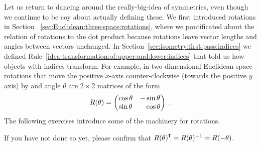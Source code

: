 Let us return to dancing around the really-big-idea of symmetries, even though we continue to be coy about actually defining these. We first introduced rotations in Section~
\ref{sec:Euclidean:three:space:rotations}, where we pontificated about the relation of rotations to the dot product because rotations leave vector lengths and angles between vectors unchanged. In Section~\ref{sec:isometry:first:pass:indices} we defined Rule~\ref{idea:transformation:of:upper:and:lower:indices} that told us how objects with indices transform. For example, in two-dimensional Euclidean space rotations that move the positive $x$-axis counter-clockwise (towards the positive $y$ axis) by and angle $\theta$ are $2\times 2$ matrices of the form
\begin{align}
    R(\theta)=
    \begin{pmatrix}
        \cos\theta & -\sin\theta \\
        \sin\theta & \pp \cos\theta
    \end{pmatrix} \ .
\end{align}
The following exercises introduce some of the machinery for rotations.
\begin{exercise}
If you have not done so yet, please confirm that $R(\theta)^{\mkern-1.5mu\mathsf{T}} = R(\theta)^{-1} = R(-\theta)$.
\end{exercise}
